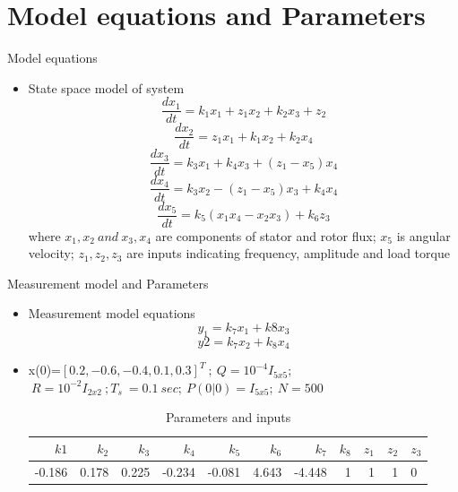 \documentclass{beamer}
\begin{document}
\section{Model equations and Parameters}
\begin{frame}{Model equations}
\begin{itemize}
    \item State space model of system
    \begin{equation}
        \frac{dx_1}{dt}=k_1x_1 + z_1x_2+k_2x_3+z_2
    \end{equation}
    \begin{equation}
        \frac{dx_2}{dt}=z_1x_1 +k_1x_2+k_2x_4
    \end{equation}
    \begin{equation}
        \frac{dx_3}{dt}=k_3x_1+k_4x_3+(z_1-x_5)x_4
    \end{equation}
    \begin{equation}
        \frac{dx_4}{dt}=k_3x_2-(z_1-x_5)x_3+k_4x_4
    \end{equation}
    \begin{equation}
        \frac{dx_5}{dt}=k_5(x_1x_4-x_2x_3)+k_6z_3
    \end{equation}
    where $x_1,x_2 \ and \ x_3,x_4$ are components of stator and rotor flux; $x_5$ is angular velocity; $z_1,z_2,z_3$ are inputs indicating frequency, amplitude and load torque
\end{itemize} 
\end{frame}
\begin{frame}{Measurement model and Parameters}
\begin{itemize}
    \item Measurement model equations
    \begin{equation}
        y_1=k_7x_1+k8x_3
    \end{equation}
    \begin{equation}
        y2=k_7x_2+k_8x_4
    \end{equation}
    \item x(0)=$[0.2,-0.6,-0.4,0.1,0.3]^T\ ;\ Q=10^{-4}I_{5x5};$\\
    $\ R=10^{-2}I_{2x2}\ ; T_s\ =0.1\ sec; \ P(0|0)=I_{5x5};\ N=500$
    \begin{table}[h!]
    \tiny
  \begin{center}
    \caption{Parameters and inputs}
    \label{tab:table1}
    \begin{tabular}{r|r|r|r|r|r|r|r|r|r|l} %
      $k1$ & $k_2$ & $k_3$ & $k_4$ & $k_5$ & $k_6$ & $k_7$ & $k_8$ &$z_1$ & $z_2$ & $z_3$ \\
      \hline
      -0.186 & 0.178 & 0.225 & -0.234 & -0.081&4.643& -4.448 & 1& 1&1 & 0
    \end{tabular}
  \end{center}
\end{table}
    
    
\end{itemize}
    
\end{frame}
\end{document}
